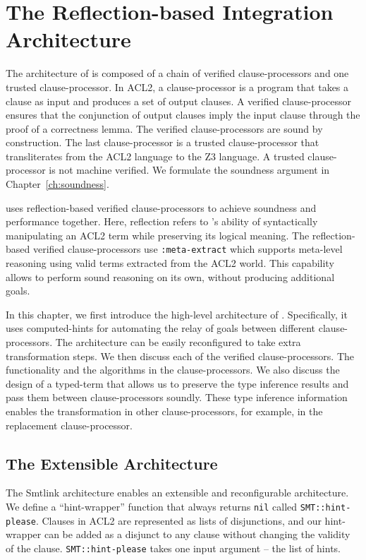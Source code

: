 \chapter{The Reflection-based Integration Architecture}
\label{ch:arch}

The architecture of \smtlink{} is composed of a chain of verified
clause-processors and one trusted clause-processor.
In ACL2, a clause-processor is a program that takes a clause as input and
produces a set of output clauses.
A verified clause-processor ensures that the conjunction of output clauses imply
the input clause through the proof of a correctness lemma.
The verified clause-processors are sound by construction. The last
clause-processor is a trusted clause-processor that transliterates from the ACL2
language to the Z3 language. A trusted clause-processor is not machine verified.
We formulate the soundness argument in Chapter~\ref{ch:soundness}.

\smtlink{} uses reflection-based verified clause-processors to achieve soundness
and performance together.
Here, reflection refers to \smtlink{}'s ability of syntactically manipulating
an ACL2 term while preserving its logical meaning.
The reflection-based verified clause-processors use \texttt{:meta-extract} which
supports meta-level reasoning using valid terms extracted from the ACL2 world.
This capability allows \smtlink{} to perform sound reasoning on its own, without
producing additional goals.

In this chapter, we first introduce the high-level architecture of \smtlink{}.
Specifically, it uses computed-hints for automating the relay of goals between
different clause-processors.
The architecture can be easily reconfigured to take extra transformation steps.
We then discuss each of the verified clause-processors. The functionality and
the algorithms in the clause-processors.
We also discuss the design of a typed-term that allows us to preserve the type
inference results and pass them between clause-processors soundly.
These type inference information enables the transformation in other
clause-processors, for example, in the replacement clause-processor.

\section{The Extensible Architecture}
The Smtlink architecture enables an extensible and reconfigurable architecture.
We define a ``hint-wrapper''\cite{hint-wrapper} function that always returns
\texttt{nil} called \texttt{SMT::hint-please}.
Clauses in ACL2 are represented as lists of disjunctions, and our hint-wrapper
can be added as a disjunct to any clause without changing the validity of the 
clause.
\texttt{SMT::hint-please} takes one input argument -- the list of hints.

